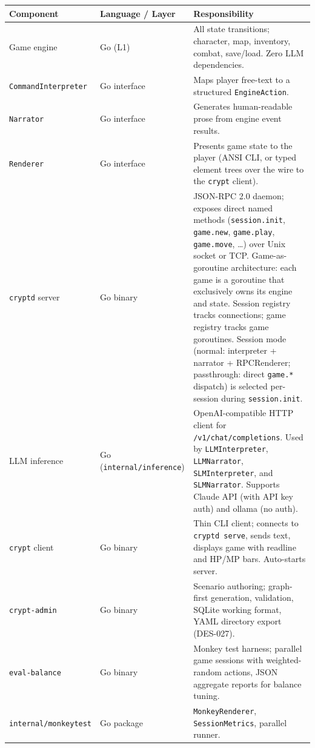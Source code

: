 \documentclass[a4paper,10pt]{article}
\newcommand{\iface}[1]{\texttt{#1}}
\newcommand{\cmd}[1]{\texttt{#1}}
\newcommand{\pkg}[1]{\texttt{#1}}
\begin{document}
\begin{center}
\begin{tabular}{lp{3cm}p{7cm}}
\toprule
\textbf{Component} & \textbf{Language / Layer} & \textbf{Responsibility} \\
\midrule
Game engine
  & Go (L1)
  & All state transitions; character, map, inventory, combat, save/load.
    Zero LLM dependencies. \\
\iface{CommandInterpreter}
  & Go interface
  & Maps player free-text to a structured \texttt{EngineAction}. \\
\iface{Narrator}
  & Go interface
  & Generates human-readable prose from engine event results. \\
\iface{Renderer}
  & Go interface
  & Presents game state to the player (ANSI CLI, or typed element
    trees over the wire to the \cmd{crypt} client). \\
\cmd{cryptd} server
  & Go binary
  & JSON-RPC 2.0 daemon; exposes direct named methods
    (\texttt{session.init}, \texttt{game.new}, \texttt{game.play},
    \texttt{game.move}, \dots) over Unix socket or TCP.
    Game-as-goroutine architecture: each game is a goroutine that
    exclusively owns its engine and state.  Session registry tracks
    connections; game registry tracks game goroutines.  Session mode
    (normal: interpreter + narrator + RPCRenderer; passthrough:
    direct \texttt{game.*} dispatch) is selected per-session during
    \texttt{session.init}. \\
LLM inference
  & Go (\pkg{internal/\allowbreak inference})
  & OpenAI-compatible HTTP client for
    \texttt{/v1/\allowbreak chat/\allowbreak completions}.
    Used by \texttt{LLM\-Interpreter}, \texttt{LLM\-Narrator},
    \texttt{SLM\-Interpreter}, and \texttt{SLM\-Narrator}.  Supports
    Claude API (with API key auth) and ollama (no auth). \\
\cmd{crypt} client
  & Go binary
  & Thin CLI client; connects to \cmd{cryptd serve}, sends text, displays
    game with readline and HP/MP bars. Auto-starts server. \\
\cmd{crypt-admin}
  & Go binary
  & Scenario authoring; graph-first generation, validation, SQLite
    working format, YAML directory export (DES-027). \\
\cmd{eval-balance}
  & Go binary
  & Monkey test harness; parallel game sessions with weighted-random
    actions, JSON aggregate reports for balance tuning. \\
\pkg{internal/monkeytest}
  & Go package
  & \texttt{MonkeyRenderer}, \texttt{SessionMetrics}, parallel runner.

\end{tabular}
\end{center}
\end{document}
